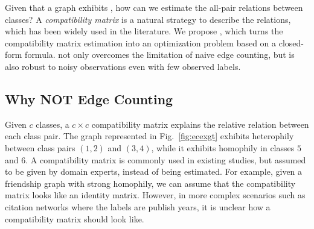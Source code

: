 

Given that a graph exhibits \nef, how can we estimate the all-pair relations between classes?
A \emph{compatibility matrix} is a natural strategy to describe the relations, which has been widely used in the literature.
We propose \methodest, which turns the compatibility matrix estimation into an optimization problem based on a closed-form formula.
\methodest not only overcomes the limitation of naive edge counting, but is also robust to noisy observations even with few observed labels.

\subsection{Why NOT Edge Counting}
Given $c$ classes, a $c \times c$ compatibility matrix explains the relative relation between each class pair.
The graph represented in Fig.~\ref{fig:ecexgt} exhibits heterophily between class pairs $(1, 2)$ and $(3, 4)$, while it exhibits homophily in classes $5$ and $6$.
A compatibility matrix is commonly used in existing studies, but assumed to be given by domain experts, instead of being estimated.
For example, given a friendship graph with strong homophily, we can assume that the compatibility matrix looks like an identity matrix.
However, in more complex scenarios such as citation networks where the labels are publish years, it is unclear how a compatibility matrix should look like.

